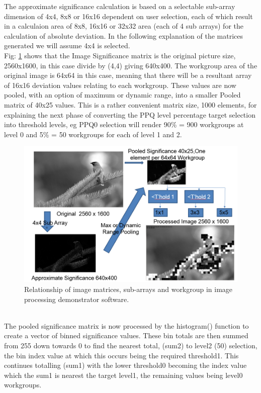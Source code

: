 \documentclass[journal]{IEEEtran}
\begin{document}
The approximate significance calculation is based on a selectable sub-array dimension of 4x4, 8x8 or 16x16 dependent on user selection, each of which result in a calculaion area of 8x8, 16x16 or 32x32 area (each of 4 sub arrays) for the calculation of absolute deviation. In the following explanation of the matrices generated we will assume 4x4 is selected.\\
Fig: \ref{fig:AdaptiveProcessing} shows that the Image Significance matrix is the original picture size, 2560x1600, in this case divide by (4,4) giving 640x400. The workgroup area of the original image is 64x64 in this case, meaning that there will be a resultant array of 16x16 deviation values relating to each workgroup. These values are now pooled, with an option of maximum or dynamic range, into a smaller Pooled matrix of 40x25 values. This is a rather convenient matrix size, 1000 elements, for explaining the next phase of converting the PPQ level percentage target selection into threshold levels, eg PPQ0 selection will render 90\% = 900 workgroups at level 0 and 5\% = 50 workgroups for each of level 1 and 2.\\
\begin{figure}[htb]
  \centering
   \includegraphics[width=1.0\columnwidth]{AdaptiveApxSigProc}
   \caption{Relationship of image matrices, sub-arrays and workgroup in image processing demonstrator software.} 
  \label{fig:AdaptiveProcessing}
\end{figure} \\
The pooled significance matrix is now processed by the histogram() function to create a vector of binned significance values. These bin totals are then summed from 255 down towards 0 to find the nearest total, (sum2) to level2 (50) selection, the bin index value at which this occurs being the required threshold1. This continues totalling (sum1) with the lower threshold0 becoming the index value which the sum1 is nearest the target level1, the remaining values being level0 workgroups.
\end{document}

